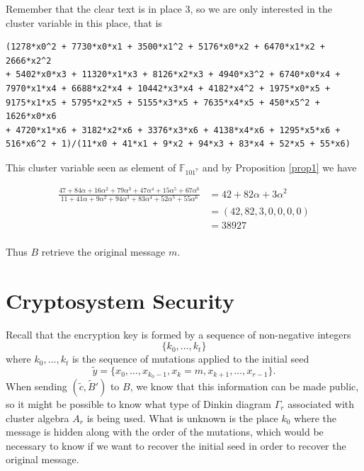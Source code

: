 \documentclass[12pt,a4paper]{article}
\begin{document}
Remember that the clear text is in place 3, so we are only interested in the cluster variable in this place, that is
\begin{verbatim}
(1278*x0^2 + 7730*x0*x1 + 3500*x1^2 + 5176*x0*x2 + 6470*x1*x2 + 2666*x2^2
+ 5402*x0*x3 + 11320*x1*x3 + 8126*x2*x3 + 4940*x3^2 + 6740*x0*x4 + 
7970*x1*x4 + 6688*x2*x4 + 10442*x3*x4 + 4182*x4^2 + 1975*x0*x5 + 
9175*x1*x5 + 5795*x2*x5 + 5155*x3*x5 + 7635*x4*x5 + 450*x5^2 + 1626*x0*x6 
+ 4720*x1*x6 + 3182*x2*x6 + 3376*x3*x6 + 4138*x4*x6 + 1295*x5*x6 + 
516*x6^2 + 1)/(11*x0 + 41*x1 + 9*x2 + 94*x3 + 83*x4 + 52*x5 + 55*x6)
\end{verbatim}

This cluster variable seen as element of $\mathbb{F}_{101^7}$ and by Proposition \ref{prop1} we have

\begin{equation*}
\begin{array}{rl}
\frac{47 + 84 \alpha + 16 \alpha^2 + 79 \alpha^3 + 47 \alpha^4 + 15 \alpha^5 + 67 \alpha^6}{11 + 41\alpha + 9 \alpha^2 + 94 \alpha^3 + 83 \alpha^4 + 52 \alpha^5 + 55 \alpha^6} & = 42+82\alpha+3\alpha^2 \\
                                                   & = (42,82,3,0,0,0,0) \\
                                                   & = 38927 \\
\end{array} 
\end{equation*}

Thus $B$ retrieve the original message $m$.
 
\section{Cryptosystem Security}

Recall that the encryption key is formed by a sequence of non-negative integers 
$$\{k_0,\ldots,k_t\}$$ where $k_0,\ldots,k_t$ is the sequence of mutations applied to the initial seed
$$\tilde{y}=\{ x_0,\ldots,x_{k_0-1},x_k=m,x_{k+1},\ldots,x_{r-1}\}.$$  When sending $(\tilde{c},\tilde{B}')$  to $B$, we know that this information can be made public, so it might be possible to know what type of Dinkin diagram $\Gamma_r$ associated with cluster algebra $A_r$ is being used. What is unknown is the place $k_0$ where the message is hidden along with the order of the mutations, which would be necessary to know if we want to recover the initial seed in order to recover the original message.
\end{document}

